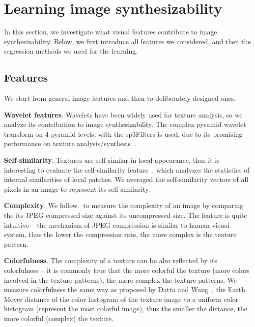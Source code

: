\section{Learning image synthesizability} 
In this section, we investigate what visual features contribute to
image synthesizability. Below, we first introduce all features we
considered, and then the regression methods we used for the learning.

\subsection{Features}
We start from general image features and then to deliberately designed
ones.

\textbf{Wavelet features}. Wavelets have been widely used for texture
analysis, so we analyze its contribution to image
synthesizability. The complex pyramid wavelet transform on $4$ pyramid
levels, with the sp3Filters is used, due to its promising performance
on texture analysis/synthesis~\cite{Portilla:2000:IJCV}.

\textbf{Self-similarity}. Textures are self-similar in local
appearance, thus it is interesting to evaluate the self-similarity
feature~\cite{self:similarity}, which analyzes the statistics of
internal similarities of local patches. We averaged the self-similarity
vectors of all pixels in an image to represent its self-similarity.

\textbf{Complexity}. We follow~\cite{image:interestingness} to measure
the complexity of an image by comparing the its JPEG compressed size
against its uncompressed size. The feature is quite intuitive -- the
mechanism of JPEG compression is similar to human visual system, thus
the lower the compression rate, the more complex is the texture
pattern.

\textbf{Colorfulness}. The complexity of a texture can be also
reflected by its colorfulness -- it is commonly true that the more
colorful the texture (more colors involved in the texture patterns),
the more complex the texture patterns. We measure colorfulness the
same way as proposed by Datta and Wang~\cite{aesthetic:eccv06}, \ie
the Earth Mover distance of the color histogram of the texture image
to a uniform color histogram (represent the most colorful image), thus
the smaller the distance, the more colorful (complex) the texture.


